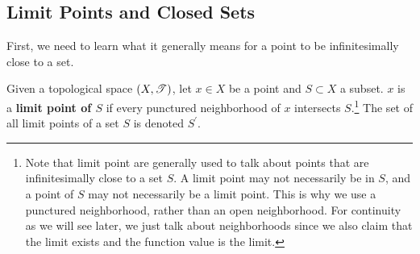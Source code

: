 \subsection{Limit Points and Closed Sets} 

  First, we need to learn what it generally means for a point to be infinitesimally close to a set. 

  \begin{definition}
    Given a topological space $(X, \operatorname{\mathscr{T}})$, let $x \in X$ be a point and $S \subset X$ a subset. $x$ is a \textbf{limit point of $S$} if every punctured neighborhood of $x$ intersects $S$.\footnote{Note that limit point are generally used to talk about points that are infinitesimally close to a set $S$. A limit point may not necessarily be in $S$, and a point of $S$ may not necessarily be a limit point. This is why we use a punctured neighborhood, rather than an open neighborhood. For continuity as we will see later, we just talk about neighborhoods since we also claim that the limit exists and the function value is the limit.} The set of all limit points of a set $S$ is denoted $S^\prime$.  
  \end{definition} 


